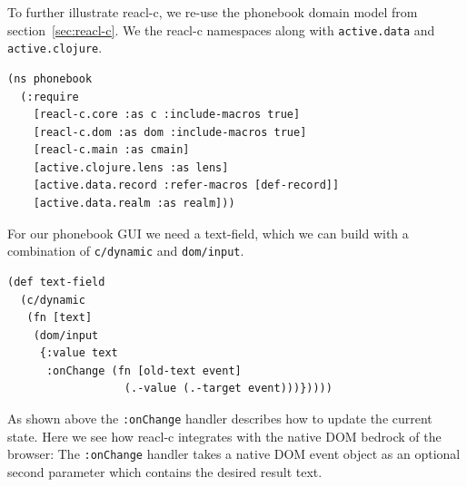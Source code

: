 \documentclass[sigplan,screen]{acmart}
\begin{document}
To further illustrate reacl-c, we re-use the phonebook domain model 
from section~\ref{sec:reacl-c}.  We the reacl-c namespaces along with
\texttt{active.data} and \texttt{active.clojure}.
%
\begin{verbatim}
(ns phonebook
  (:require
    [reacl-c.core :as c :include-macros true]
    [reacl-c.dom :as dom :include-macros true]
    [reacl-c.main :as cmain]
    [active.clojure.lens :as lens]
    [active.data.record :refer-macros [def-record]]
    [active.data.realm :as realm]))
\end{verbatim}
%
For our phonebook GUI we need a text-field, which we can build
with a combination of \texttt{c/dynamic} and \texttt{dom/input}.
%
\begin{verbatim}
(def text-field
  (c/dynamic
   (fn [text]
    (dom/input
     {:value text
      :onChange (fn [old-text event]
                  (.-value (.-target event)))}))))
\end{verbatim}
%
As shown above the \texttt{:onChange} handler describes how to update
the current state.  Here we see how reacl-c integrates with the native
DOM bedrock of the browser: The \texttt{:onChange} handler takes a
native DOM event object as an optional second
parameter which contains the desired result text.
\end{document}
